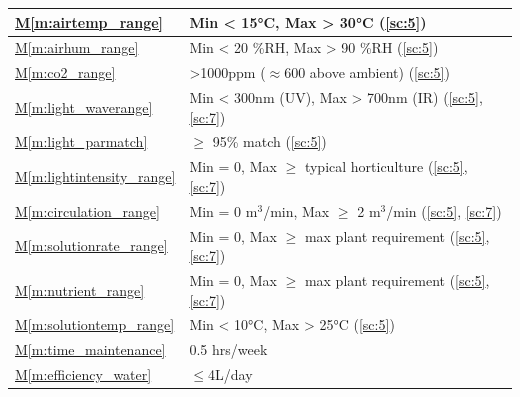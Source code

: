 \documentclass{../tex/report}
\newcommand{\mref}[1]{\hyperref[#1]{M\ref{#1}}}
\begin{document}
\begin{tabular}{|l|p{14.35cm}|}
    \mref{m:airtemp_range}              & Min < 15°C, Max > 30°C                                            \hfill (\ref{sc:5})                                     \\ \hline %
    \mref{m:airhum_range}               & Min < 20 \%RH, Max > 90 \%RH                                      \hfill (\ref{sc:5})                                     \\ \hline %
    \mref{m:co2_range}                  & >1000ppm ($\approx$600 above ambient)                             \hfill (\ref{sc:5})                                     \\ \hline
    \mref{m:light_waverange}            & Min < 300nm (UV), Max > 700nm (IR)                                \hfill (\ref{sc:5}, \ref{sc:7}) \cite{uvc-disinfection} \\ \hline %
    \mref{m:light_parmatch}             & $\ge$ 95\% match                                                  \hfill (\ref{sc:5})                                     \\ \hline %
    \mref{m:lightintensity_range}       & Min = 0, Max $\ge$ typical horticulture                           \hfill (\ref{sc:5}, \ref{sc:7})                         \\ \hline %
    \mref{m:circulation_range}          & Min = 0 m${}^3$/min, Max $\ge$ 2 m${}^3$/min                      \hfill (\ref{sc:5}, \ref{sc:7})                         \\ \hline
    \mref{m:solutionrate_range}         & Min = 0, Max $\ge$ max plant requirement                          \hfill (\ref{sc:5}, \ref{sc:7})                         \\ \hline %
    \mref{m:nutrient_range}             & Min = 0, Max $\ge$ max plant requirement                          \hfill (\ref{sc:5}, \ref{sc:7})                         \\ \hline %
    \mref{m:solutiontemp_range}         & Min < 10°C, Max > 25°C                                            \hfill (\ref{sc:5})                                     \\ \hline %
    \mref{m:time_maintenance}           & 0.5 hrs/week                                                      \hfill \cite{dsfc-phase2}                               \\ \hline
    \mref{m:efficiency_water}           & $\le$4L/day                                                       \hfill \cite{dsfc-phase2}                               \\ \hline

\end{tabular}
\end{document}
